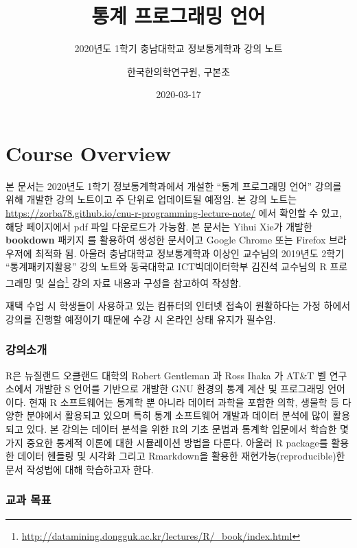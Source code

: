\documentclass[
  11pt,
]{krantz}
\title{통계 프로그래밍 언어}
\subtitle{2020년도 1학기 충남대학교 정보통계학과 강의 노트}
\author{한국한의학연구원, 구본초}
\date{2020-03-17}
\renewcommand{\href}[2]{#2\footnote{\url{#1}}}
\let\BeginKnitrBlock\begin \let\EndKnitrBlock\end
\begin{document}
\maketitle

{
\hypersetup{linkcolor=}
\setcounter{tocdepth}{2}
\tableofcontents
}
\listoftables
\listoffigures
\hypertarget{overview}{%
\chapter*{Course Overview}\label{overview}}


\BeginKnitrBlock{rmdnote}
본 문서는 2020년도 1학기 정보통계학과에서 개설한 ``통계 프로그래밍 언어'' 강의를 위해 개발한 강의 노트이고 주 단위로 업데이트될 예정임. 본 강의 노트는 \url{https://zorba78.github.io/cnu-r-programming-lecture-note/} 에서 확인할 수 있고, 해당 페이지에서 pdf 파일 다운로드가 가능함. 본 문서는 Yihui Xie가 개발한 \textbf{bookdown} 패키지 \citep{R-bookdown}를 활용하여 생성한 문서이고 Google Chrome 또는 Firefox 브라우저에 최적화 됨. 아울러 충남대학교 정보통계학과 이상인 교수님의 2019년도 2학기 ``통계패키지활용'' 강의 노트와 동국대학교 ICT빅데이터학부 김진석 교수님의 \href{http://datamining.dongguk.ac.kr/lectures/R/_book/index.html}{R 프로그래밍 및 실습} 강의 자료 내용과 구성을 참고하여 작성함.

재택 수업 시 학생들이 사용하고 있는 컴퓨터의 인터넷 접속이 원활하다는 가정 하에서 강의를 진행할 예정이기 때문에 수강 시 온라인 상태 유지가 필수임.
\EndKnitrBlock{rmdnote}

\hypertarget{intro-lec}{%
\subsection*{강의소개}\label{intro-lec}}


R은 뉴질랜드 오클랜드 대학의 Robert Gentleman 과 Ross Ihaka 가 AT\&T 벨 연구소에서 개발한 S 언어를 기반으로 개발한 GNU 환경의 통계 계산 및 프로그래밍 언어이다. 현재 R 소프트웨어는 통계학 뿐 아니라 데이터 과학을 포함한 의학, 생물학 등 다양한 분야에서 활용되고 있으며 특히 통계 소프트웨어 개발과 데이터 분석에 많이 활용되고 있다. 본 강의는 데이터 분석을 위한 R의 기초 문법과 통계학 입문에서 학습한 몇 가지 중요한 통계적 이론에 대한 시뮬레이션 방법을 다룬다. 아울러 R package를 활용한 데이터 헨들링 및 시각화 그리고 Rmarkdown을 활용한 재현가능(reproducible)한 문서 작성법에 대해 학습하고자 한다.

\hypertarget{purpose-course}{%
\subsection*{교과 목표}\label{purpose-course}}
\end{document}
